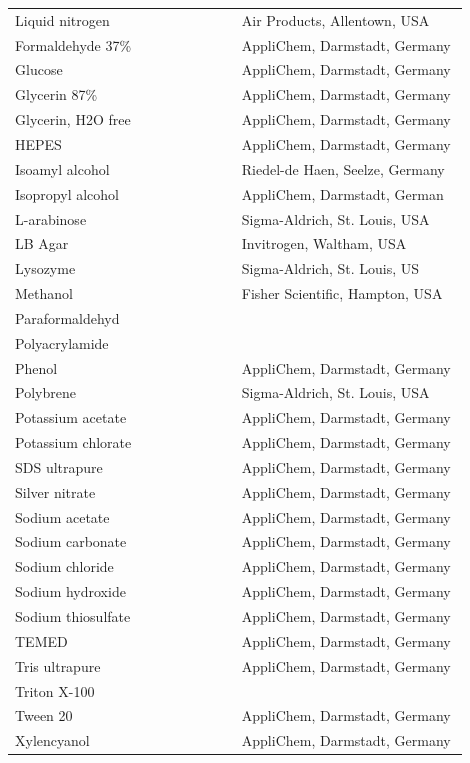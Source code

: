 \begin{longtable}{L{0.45\linewidth} R{0.45\linewidth}}
Liquid   nitrogen       & Air Products, Allentown, USA           \\
Formaldehyde 37\%       & AppliChem,   Darmstadt, Germany        \\
Glucose                 & AppliChem,   Darmstadt, Germany        \\
Glycerin 87\%           & AppliChem, Darmstadt,   Germany        \\
Glycerin, H2O free      & AppliChem,   Darmstadt, Germany        \\
HEPES                   & AppliChem,   Darmstadt, Germany        \\
Isoamyl alcohol         & Riedel-de   Haen, Seelze, Germany      \\
Isopropyl alcohol       & AppliChem,   Darmstadt, German         \\
L-arabinose             & Sigma-Aldrich, St. Louis, USA          \\
LB Agar                 & Invitrogen,   Waltham, USA             \\
Lysozyme                & Sigma-Aldrich, St. Louis, US           \\
Methanol                & Fisher Scientific, Hampton, USA        \\
Paraformaldehyd         &                                         \\
Polyacrylamide          &                                        \\
Phenol                  & AppliChem,   Darmstadt, Germany        \\
Polybrene               & Sigma-Aldrich,   St. Louis, USA        \\
Potassium acetate       & AppliChem,   Darmstadt, Germany        \\
Potassium chlorate      & AppliChem,   Darmstadt, Germany        \\
SDS ultrapure           & AppliChem,   Darmstadt, Germany        \\
Silver nitrate          & AppliChem,   Darmstadt, Germany        \\
Sodium acetate          & AppliChem,   Darmstadt, Germany        \\
Sodium carbonate        & AppliChem,   Darmstadt, Germany        \\
Sodium chloride         & AppliChem,   Darmstadt, Germany        \\
Sodium hydroxide        & AppliChem,   Darmstadt, Germany        \\
Sodium thiosulfate      & AppliChem,   Darmstadt, Germany        \\
TEMED                   & AppliChem,   Darmstadt, Germany        \\
Tris ultrapure          & AppliChem,   Darmstadt, Germany        \\
Triton X-100            &                                        \\
Tween 20                & AppliChem,   Darmstadt, Germany        \\
Xylencyanol             & AppliChem,   Darmstadt, Germany      \\ 


\end{longtable}
